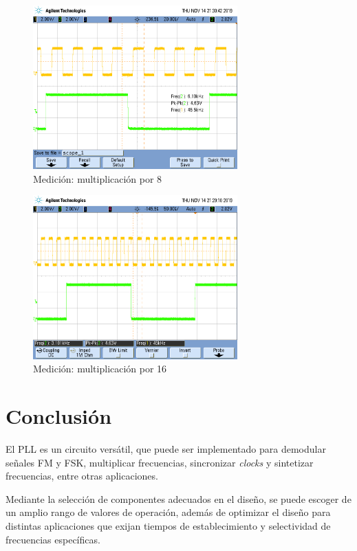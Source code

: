 \begin{figure}[H]
    \centering
    \includegraphics[width=0.7\textwidth]{resources/medicionstep8.png}
    \caption{Medición: multiplicación por 8}
    \label{medicionstep8}
\end{figure}

\begin{figure}[H]
    \centering
    \includegraphics[width=0.7\textwidth]{resources/medicionstep16.png}
    \caption{Medición: multiplicación por 16}
    \label{medicionstep16}
\end{figure}


\section{Conclusión}
El PLL es un circuito versátil, que puede ser implementado para demodular señales FM y FSK, multiplicar frecuencias, sincronizar \emph{clocks} y sintetizar frecuencias, entre otras aplicaciones.

Mediante la selección de componentes adecuados en el diseño, se puede escoger de un amplio rango de valores de operación, además de optimizar el diseño para distintas aplicaciones que exijan tiempos de establecimiento y selectividad de frecuencias específicas.

